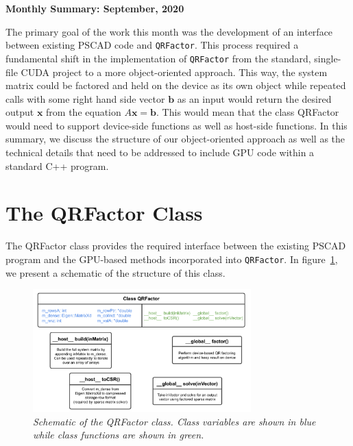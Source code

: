 \documentclass[11pt,letterpaper]{article}
\newcommand{\qrf}{\texttt{QRFactor}}
\begin{document}
\begin{center}
    {\Large \bf Monthly Summary: September, 2020}
\end{center}

The primary goal of the work this month was the development of an interface between existing PSCAD code and \verb+QRFactor+. This process required a fundamental shift in the implementation of \verb+QRFactor+ from the standard, single-file CUDA project to a more object-oriented approach. This way, the system matrix could be factored and held on the device as its own object while repeated calls with some right hand side vector $\mathbf{b}$ as an input would return the desired output $\mathbf{x}$ from the equation $A\mathbf{x} = \mathbf{b}$. This would mean that the class QRFactor would need to support device-side functions as well as host-side functions. In this summary, we discuss the structure of our object-oriented approach as well as the technical details that need to be addressed to include GPU code within a standard C++ program.


\section*{The QRFactor Class}

The QRFactor class provides the required interface between the existing PSCAD program and the GPU-based methods incorporated into \qrf. In figure~\ref{f:qrclass}, we present a schematic of the structure of this class. 

\begin{figure}[ht]
    \centering
    \includegraphics[width=0.75\textwidth]{MHI QRFactor.pdf}
    \caption{{\it Schematic of the QRFactor class. Class variables are shown in blue while class functions are shown in green.}}
    \label{f:qrclass}
\end{figure}
\end{document}
